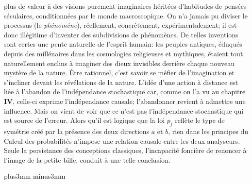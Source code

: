 plus de valeur \`a des visions purement imaginaires h\'erit\'ees d'habitudes
de pens\'ees s\'eculaires,  conditionn\'ees par le monde macroscopique. 
On n'a jamais pu diviser le processus (le {\it ph\'enom\`ene}),  r\'eellement, 
concr\`etement,  exp\'erimentalement;  il est donc ill\'egitime d'inventer des
subdivisions de ph\'enom\`enes.  De telles inventions sont certes une pente
naturelle de l'esprit humain:  les peuples antiques,  \'eduqu\'es depuis des
mill\'enaires dans les cosmologies religieuses et mythiques,  \'etaient tout
naturellement enclins \`a imaginer des dieux invisibles derri\`ere chaque
nouveau myst\`ere de la nature.  \^Etre rationnel,  c'est savoir se m\'efier
de l'imagination et s'incliner devant les r\'ev\'elations de la nature. 
\medskip 
L'id\'ee d'une action \`a distance est li\'ee \`a l'abandon de  
l'ind\'ependance stochastique car,  comme on l'a vu au chapitre {\bf IV}, 
celle-ci exprime l'ind\'e\-pen\-dance causale;  l'abandonner revient \`a 
admettre une influence.  Mais on vient de voir que ce n'est pas 
l'ind\'ependance stochastique  qui est source de l'erreur.  Alors qu'il est 
logique que la loi $p_j$ refl\`ete le type de sym\'etrie cr\'e\'e par la 
pr\'esence des deux directions $a$ et $b$,  rien dans les principes du 
Calcul des probabilit\'es n'impose une relation causale entre les deux 
analyseurs.  Seule la persistance des conceptions classiques, 
l'incapacit\'e fonci\`ere de renoncer \`a l'image de la petite bille,  
conduit \`a une telle conclusion. 

\vskip6mm plus3mm minus3mm

